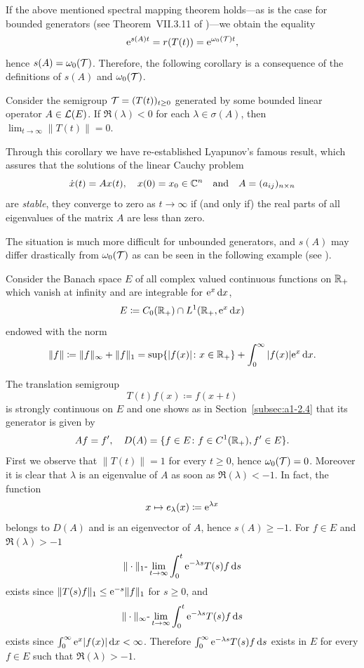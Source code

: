 If the above mentioned spectral mapping theorem holds---as is the case for bounded generators (\eg see Theorem~VII.3.11 of \textcite{dunfordschwartz:1958})---we obtain the equality
\[
    \mathrm{e}^{s(A)t} = r(T(t)) = \mathrm{e}^{\omega_{0}(\mathcal{T}) t} ,
\]
hence $s(A) = \omega_{0}(\mathcal{T})$.
Therefore, the following corollary is a consequence of the definitions of\/ $s(A)$ and $\omega_{0}(\mathcal{T})$.
\begin{corollary}\label{cor:a3-1.2}
Consider the semigroup $\TT = (T(t))_{t \geq 0}$ generated by some bounded linear operator $A \in \mathcal{L}(E)$.
If\/ $\Re(\lambda) < 0$ for each $\lambda \in \sigma(A)$, then 
\mbox{$\lim_{t \to \infty}\|T(t)\| = 0$.}
\end{corollary}
Through this corollary we have re-established Lyapunov's  famous result, which assures that the solutions of the linear Cauchy problem
\[
    \dot{x}(t) = Ax(t), \quad x(0) = x_{0} \in \mathbb{C}^{n} \quad \text{and} \quad A = (a_{ij})_{n\times n}
\]
are \emph{stable}, \ie they converge to zero as $t \to \infty$ if (and only if) the real parts of all eigenvalues of the matrix $A$ are less than zero.

The situation is much more difficult for unbounded generators, and $s(A)$ may differ drastically from $\omega_{0}(\mathcal{T})$ as can be seen in the following example (see \textcite{greinervoigtwolff:1981}).
\begin{example}\label{ex:a3-1.3}
Consider the Banach space $E$ of all complex valued continuous functions on $\mathbb{R}_{+}$ which vanish at infinity and are integrable for $\mathrm{e}^{x}\mathop{}\!\mathrm{d}{x}$, \ie 
\[
    E \coloneq C_{0}(\mathbb{R}_{+}) \cap L^{1}(\mathbb{R}_{+}, \mathrm{e}^{x}\mathop{}\!\mathrm{d}{x})
\]
endowed with the norm
\[
    \|f\| \coloneq \|f\|_{\infty} + \|f\|_{1} = \sup\{|f(x)| \colon x \in \mathbb{R}_{+}\} + \int_{0}^{\infty} |f(x)|\mathrm{e}^{x} \mathop{}\!\mathrm{d}{x} .
\]
\end{example}
The translation semigroup
\[
    T(t)f(x) \coloneq f(x+t)
\]
is strongly continuous on $E$ and one shows as in Section~\ref{subsec:a1-2.4} that its generator is given by
\[
    Af = f', \quad D(A) = \{ f \in E \colon f \in C^{1}(\mathbb{R}_{+}), f' \in E \} .
\]
First we observe that $\|T(t)\| = 1$ for every $t \geq 0$, hence $\omega_{0}(\mathcal{T}) = 0$.
Moreover it is clear that $\lambda$ is an eigenvalue of\/ $A$ as soon as $\Re(\lambda) < -1$. In fact, the function
\[
    x \mapsto e_{\lambda}(x) \coloneq \mathrm{e}^{\lambda x}
\]
belongs to $D(A)$ and is an eigenvector of\/ $A$, hence $s(A) \geq -1$.
For $f \in E$ and $\Re(\lambda) > -1$ 
\[
    \|\cdot\|_{1}\text{-}\lim_{t \to \infty} \int_{0}^{t} \mathrm{e}^{-\lambda s}T(s)f \mathop{}\!\mathrm{d}{s}
\]
exists since $\|T(s)f\|_{1} \leq \eu^{-s}\|f\|_{1}$ for $s \geq 0$, and
\[
    \|\cdot\|_{\infty}\text{-}\lim_{t \to \infty} \int_{0}^{t} \mathrm{e}^{-\lambda s}T(s)f \mathop{}\!\mathrm{d}{s}
\]
exists since $\int_{0}^{\infty} \mathrm{e}^{x}|f(x)| \mathop{}\!\mathrm{d}{x} < \infty$.
Therefore $\int_{0}^{\infty} \mathrm{e}^{-\lambda s}T(s)f \mathop{}\!\mathrm{d}{s}$ exists in $E$ for every $f \in E$ such that $\Re(\lambda) > -1$.

